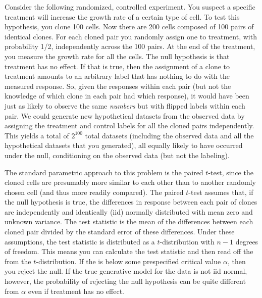 

\begin{example}[label=exa:cont] Consider the following randomized, controlled
experiment.  You suspect a specific treatment will increase the growth rate of
a certain type of cell.  To test this hypothesis, you clone 100 cells. Now
there are 200 cells composed of 100 pairs of identical clones. For each cloned
pair you randomly assign one to treatment, with probability 1/2, independently
across the 100 pairs.  At the end of the treatment, you measure the growth rate
for all the cells.  The null hypothesis is that treatment has no effect.
If that is true, then the assignment of a clone to treatment amounts to an
arbitrary label that has nothing to do with the measured response.  So, given
the responses within each pair (but not the knowledge of which clone in each
pair had which response), it would have been just as likely to observe
the same \emph{numbers} but with flipped labels within each pair.
We could
generate new hypothetical datasets from the observed data by assigning the
treatment and control labels for all the cloned pairs independently.  This
yields a total of $2^{100}$ total datasets (including the observed data and all
the hypothetical datasets that you generated), all equally likely to have
occurred under the null, conditioning on the observed data (but not the labeling).

The standard parametric approach to this problem is the paired $t$-test, since
the cloned cells are presumably more similar to each other than to another
randomly chosen cell (and thus more readily compared).  The paired $t$-test
assumes that, if the null hypothesis is true, the differences in response
between each pair of clones are 
independently and identically (iid) normally distributed with mean zero and unknown variance.
The test statistic is the mean of the differences between each cloned pair
divided by the standard error of these differences.  
Under these assumptions, the test statistic is
distributed as a $t$-distribution with $n-1$ degrees of freedom.  This means you can
calculate the test statistic and then read off the \pvalue{} from the
$t$-distribution.  If the \pvalue{} is below some prespecified critical value
$\alpha$, then you reject the null.  
If the true generative model for the data is not iid normal, however, the
probability of rejecting the null hypothesis can be quite different from $\alpha$
even if treatment has no effect.


\end{example}
